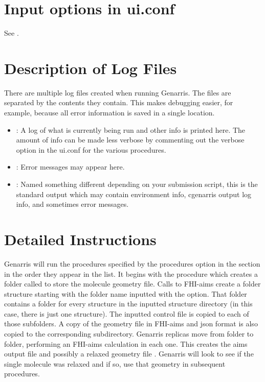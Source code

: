 \documentclass[letterpaper,10pt,english]{sphinxmanual}
\begin{document}
\section{Input options in ui.conf}
\label{\detokenize{index:input-options-in-ui-conf}}
See {\hyperref[\detokenize{index:documentation}]{}}.


\section{Description of Log Files}
\label{\detokenize{index:description-of-log-files}}
There are multiple log files created when running Genarris. The files are
separated by the contents they contain. This makes debugging easier, for example,
because all error information is saved in a single location.
\begin{itemize}
\item {} 
: \leavevmode A log of what is currently being run and other info is printed here. 
The amount of info can be made less verbose by commenting out the verbose
option in the ui.conf for the various procedures.

\item {} 
: Error messages may appear here.

\item {} 
: Named something different depending on your submission script,
this is the standard output which may contain environment info,
cgenarris output log info, and sometimes error messages.

\end{itemize}


\section{Detailed Instructions}
\label{\detokenize{index:detailed-instructions}}\label{\detokenize{index:id1}}
Genarris will run the procedures specified by the procedures option in the
 section in the order they appear in the list.
It begins with the  procedure which creates a folder
called  to store the
molecule geometry file. Calls to FHI-aims create a folder structure starting
with the folder name inputted with the  option.
That folder contains a folder for every structure in the inputted structure
directory (in this case, there is just one structure). The
inputted control file is copied to each of those subfolders. A copy of the
geometry file in FHI-aims and json format is also copied to the
corresponding subdirectory. Genarris replicas move from folder to folder,
performing an FHI-aims calculation in each one. This creates
the aims output file  and possibly a relaxed geometry file
. Genarris will look to see if the single molecule
was relaxed and if so, use that geometry in subsequent procedures.
\end{document}

